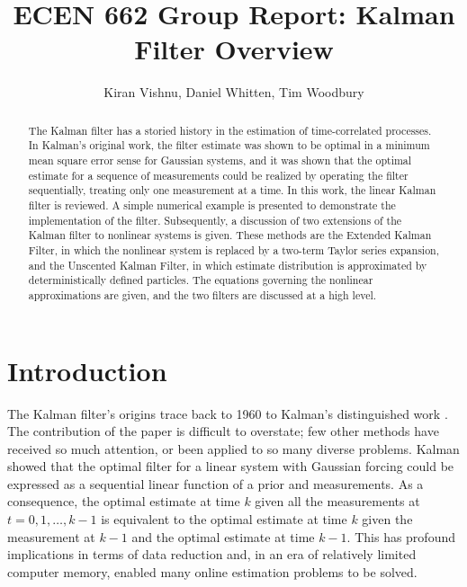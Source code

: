 \documentclass[12pt,draftcls,onecolumn]{IEEEtran}
\author{Kiran Vishnu, Daniel Whitten, Tim Woodbury}
\title{ECEN 662 Group Report: Kalman Filter Overview}
\begin{document}
\maketitle

\begin{abstract}
The Kalman filter has a storied history in the estimation of time-correlated processes.
In Kalman's original work, the filter estimate was shown to be optimal in a minimum mean square error sense for Gaussian systems, and it was shown that the optimal estimate for a sequence of measurements could be realized by operating the filter sequentially, treating only one measurement at a time.
In this work, the linear Kalman filter is reviewed.
A simple numerical example is presented to demonstrate the implementation of the filter.
Subsequently, a discussion of two extensions of the Kalman filter to nonlinear systems is given.
These methods are the Extended Kalman Filter, in which the nonlinear system is replaced by a two-term Taylor series expansion, and the Unscented Kalman Filter, in which estimate distribution is approximated by deterministically defined particles.
The equations governing the nonlinear approximations are given, and the two filters are discussed at a high level.
\end{abstract}

\section{Introduction}

The Kalman filter's origins trace back to 1960 to Kalman's distinguished work \cite{kalman1960}.
The contribution of the paper is difficult to overstate; few other methods have received so much attention, or been applied to so many diverse problems.
Kalman showed that the optimal filter for a linear system with Gaussian forcing could be expressed as a sequential linear function of a prior and measurements.
As a consequence, the optimal estimate at time $k$ given all the measurements at $t = 0, 1, \dots, k-1$ is equivalent to the optimal estimate at time $k$ given the measurement at $k-1$ and the optimal estimate at time $k-1$.
This has profound implications in terms of data reduction and, in an era of relatively limited computer memory, enabled many online estimation problems to be solved.
\end{document}
